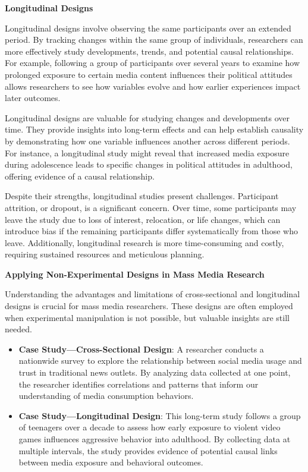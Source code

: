 \documentclass[
]{book}
\begin{document}
\textbf{Longitudinal Designs}

Longitudinal designs involve observing the same participants over an extended period. By tracking changes within the same group of individuals, researchers can more effectively study developments, trends, and potential causal relationships. For example, following a group of participants over several years to examine how prolonged exposure to certain media content influences their political attitudes allows researchers to see how variables evolve and how earlier experiences impact later outcomes.

Longitudinal designs are valuable for studying changes and developments over time. They provide insights into long-term effects and can help establish causality by demonstrating how one variable influences another across different periods. For instance, a longitudinal study might reveal that increased media exposure during adolescence leads to specific changes in political attitudes in adulthood, offering evidence of a causal relationship.

Despite their strengths, longitudinal studies present challenges. Participant attrition, or dropout, is a significant concern. Over time, some participants may leave the study due to loss of interest, relocation, or life changes, which can introduce bias if the remaining participants differ systematically from those who leave. Additionally, longitudinal research is more time-consuming and costly, requiring sustained resources and meticulous planning.

\textbf{Applying Non-Experimental Designs in Mass Media Research}

Understanding the advantages and limitations of cross-sectional and longitudinal designs is crucial for mass media researchers. These designs are often employed when experimental manipulation is not possible, but valuable insights are still needed.

\begin{itemize}
\item
  \textbf{Case Study---Cross-Sectional Design}: A researcher conducts a nationwide survey to explore the relationship between social media usage and trust in traditional news outlets. By analyzing data collected at one point, the researcher identifies correlations and patterns that inform our understanding of media consumption behaviors.
\item
  \textbf{Case Study---Longitudinal Design}: This long-term study follows a group of teenagers over a decade to assess how early exposure to violent video games influences aggressive behavior into adulthood. By collecting data at multiple intervals, the study provides evidence of potential causal links between media exposure and behavioral outcomes.
\end{itemize}
\end{document}
